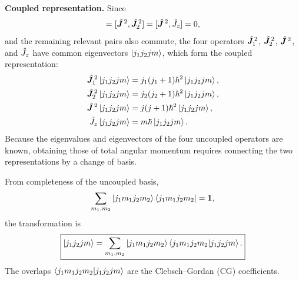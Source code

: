 \textbf{Coupled representation.} Since
\begin{equation}
[\op{\vect J}^{\,2},\op{\vect J}_1^{\,2}]
=[\op{\vect J}^{\,2},\op{\vect J}_2^{\,2}]
=[\op{\vect J}^{\,2},\op J_z]=0,
\end{equation}
and the remaining relevant pairs also commute, the four operators $\hat{\bm{J}}_1^{\,2}$, $\hat{\bm{J}}_2^{\,2}$, $\hat{\bm{J}}^{\,2}$, and $\hat{J}_z$ have common eigenvectors $\left|j_1j_2jm\right\rangle$, which form the coupled representation:
\begin{equation}
\begin{aligned}
\hat{\bm{J}}_1^{\,2}\left|j_1j_2jm\right\rangle&=j_1(j_1+1)\hbar^2\left|j_1j_2jm\right\rangle,\\
\hat{\bm{J}}_2^{\,2}\left|j_1j_2jm\right\rangle&=j_2(j_2+1)\hbar^2\left|j_1j_2jm\right\rangle,\\
\hat{\bm{J}}^{\,2}\left|j_1j_2jm\right\rangle&=j(j+1)\hbar^2\left|j_1j_2jm\right\rangle,\\
\hat{J}_z\left|j_1j_2jm\right\rangle&=m\hbar\left|j_1j_2jm\right\rangle.
\end{aligned}
\end{equation}
Because the eigenvalues and eigenvectors of the four uncoupled operators are known, obtaining those of total angular momentum requires connecting the two representations by a change of basis.

From completeness of the uncoupled basis,
\begin{equation}
\sum_{m_1,m_2}\left|j_1m_1j_2m_2\right\rangle\left\langle j_1m_1j_2m_2\right|=\mathbf1,
\end{equation}
the transformation is
\begin{equation}
\boxed{\left|j_1j_2jm\right\rangle=\sum_{m_1,m_2}\left|j_1m_1j_2m_2\right\rangle
\left\langle j_1m_1j_2m_2\middle|j_1j_2jm\right\rangle.}
\end{equation}
The overlaps $\left\langle j_1m_1j_2m_2\middle|j_1j_2jm\right\rangle$ are the Clebsch--Gordan (CG) coefficients.

